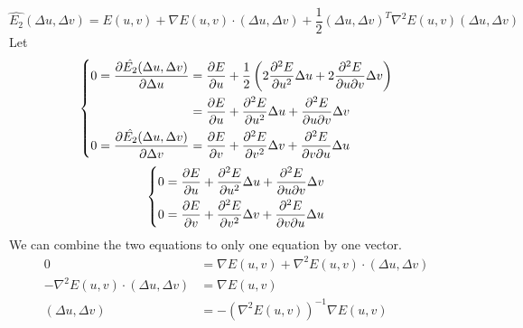 \documentclass[12pt,a4paper]{article}
\begin{document}
\[
	\hat{{E}_2}(\Delta u,\Delta v)
		= E(u, v) + \nabla E(u, v) \cdot (\Delta u, \Delta v)
		+ \frac{1}{2} {(\Delta u, \Delta v)}^{T} {\nabla}^{2}E(u, v) (\Delta u, \Delta v)
\]
Let
\[
	\left\{
		\begin{aligned}
			0 = \pdv{\hat{{E}_2}(\Delta u,\Delta v)}{\Delta u}
				&= \pdv{E}{u} + \frac{1}{2}\left( 2 \pdv[2]{E}{u} \Delta u + 2 \pdv{E}{u}{v} \Delta v \right) \\
				&= \pdv{E}{u} + \pdv[2]{E}{u} \Delta u + \pdv{E}{u}{v} \Delta v \\
			0 = \pdv{\hat{{E}_2}(\Delta u,\Delta v)}{\Delta v}
				&= \pdv{E}{v} + \pdv[2]{E}{v} \Delta v + \pdv{E}{v}{u} \Delta u \\
		\end{aligned}
	\right.
\]
\[
	\left\{
		\begin{aligned}
			0 &= \pdv{E}{u} + \pdv[2]{E}{u} \Delta u + \pdv{E}{u}{v} \Delta v \\
			0 &= \pdv{E}{v} + \pdv[2]{E}{v} \Delta v + \pdv{E}{v}{u} \Delta u \\
		\end{aligned}
	\right.
\]
We can combine the two equations to only one equation by one vector.
\[
	\begin{aligned}
		0 &= \nabla E(u, v) + {\nabla}^{2} E(u, v) \cdot (\Delta u, \Delta v) \\
		- {\nabla}^{2} E(u, v) \cdot (\Delta u, \Delta v) &= \nabla E(u, v) \\
		(\Delta u, \Delta v) &= - {\left({\nabla}^{2} E(u, v)\right)}^{-1} \nabla E(u, v)
	\end{aligned}
\]
\end{document}
